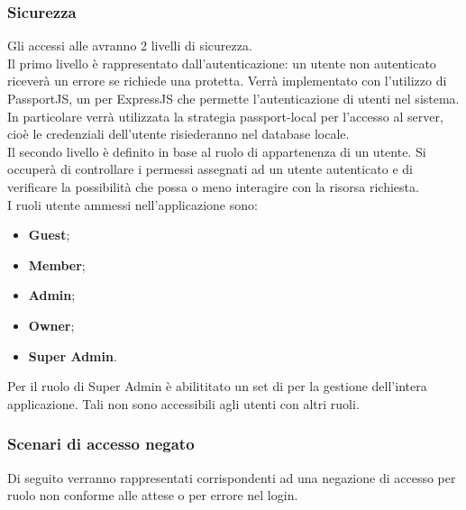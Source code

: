 \subsubsection{Sicurezza}
Gli accessi alle  avranno 2 livelli di sicurezza. \\
Il primo livello è rappresentato dall'autenticazione: un utente non autenticato riceverà un errore se richiede una  protetta. Verrà implementato con l'utilizzo di PassportJS, un  per ExpressJS che permette l'autenticazione di utenti nel sistema. In particolare verrà utilizzata la strategia passport-local per l'accesso al server, cioè le credenziali dell'utente risiederanno nel database locale. \\
Il secondo livello è definito in base al ruolo di appartenenza di un utente. Si occuperà di controllare i permessi assegnati ad un utente autenticato e di verificare la possibilità che possa o meno interagire con la risorsa richiesta. \\
I ruoli utente ammessi nell'applicazione sono: 
\begin{itemize}
\item \textbf{Guest};
\item \textbf{Member};
\item \textbf{Admin};
\item \textbf{Owner};
\item \textbf{Super Admin}.
\end{itemize}
Per il ruolo di Super Admin è abilititato un set di  per la gestione dell'intera applicazione. Tali  non sono accessibili agli utenti con altri ruoli.
\newpage
\subsubsection{Scenari di accesso negato}
Di seguito verranno rappresentati  corrispondenti ad una negazione di accesso per ruolo non conforme alle attese o per errore nel login.
